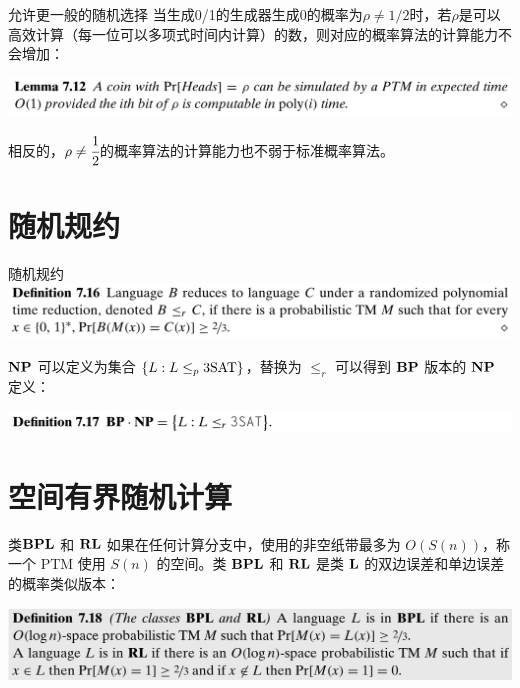 \documentclass[UTF8,aspectratio=169,mathserif]{beamer}
\begin{document}
	\begin{frame}{允许更一般的随机选择}
		当生成0/1的生成器生成0的概率为$\rho\neq1/2$时，若$\rho$是可以高效计算（每一位可以多项式时间内计算）的数，则对应的概率算法的计算能力不会增加：\newline
		
		\includegraphics[width=\linewidth]{../../7/note.assets/image-20210509154955249.png}\newline
		
		相反的，$\rho\neq\cfrac{1}{2}$的概率算法的计算能力也不弱于标准概率算法。
	\end{frame}
	
	\section{随机规约}
	\begin{frame}{随机规约}
		\includegraphics[width=\linewidth]{../../7/note.assets/image-20210509155949766.png}\newline
		
		$\bf NP$ 可以定义为集合 $\{L:L\le_p{\rm 3SAT}\}$，替换为 $\le_r$ 可以得到 $\bf BP$ 版本的 $\bf NP$ 定义：
		
		\includegraphics[width=\linewidth]{../../7/note.assets/image-20210509162341964.png}
	\end{frame}

	\section{空间有界随机计算}
	\begin{frame}{类$\bf BPL$ 和 $\bf RL$}
		如果在任何计算分支中，使用的非空纸带最多为 $O(S(n))$，称一个 PTM 使用 $S(n)$ 的空间。类 $\bf BPL$ 和 $\bf RL$ 是类 $\bf L$ 的双边误差和单边误差的概率类似版本：\newline
		
		\includegraphics[width=\linewidth]{../../7/note.assets/image-20210509162758560.png}
	\end{frame}
\end{document}
